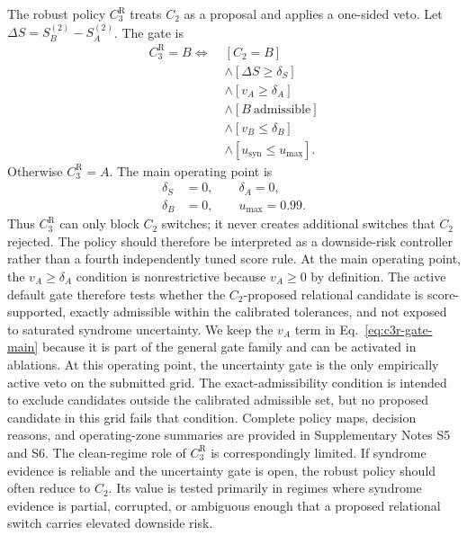 \documentclass{iopjournal}
\begin{document}
The robust policy $C_3^{\mathrm{R}}$ treats $C_2$ as a proposal and applies a
one-sided veto. Let $\Delta S=S_B^{(2)}-S_A^{(2)}$. The gate is
\begin{equation}
\begin{aligned}
C_3^{\mathrm{R}}=B
\Longleftrightarrow\;&
\left[C_2=B\right]
\\
&\wedge
\left[\Delta S\ge\delta_S\right]
\\
&\wedge
\left[v_A\ge\delta_A\right]
\\
&\wedge
\left[B\ \mathrm{admissible}\right]
\\
&\wedge
\left[v_B\le\delta_B\right]
\\
&\wedge
\left[u_{\mathrm{syn}}\le u_{\max}\right].
\end{aligned}
\label{eq:c3r-gate-main}
\end{equation}
Otherwise $C_3^{\mathrm{R}}=A$. The main operating point is
\begin{equation}
\begin{aligned}
\delta_S&=0,
\qquad
\delta_A=0,\\
\delta_B&=0,
\qquad
u_{\max}=0.99.
\end{aligned}
\end{equation}
Thus $C_3^{\mathrm{R}}$ can only block $C_2$ switches; it never creates additional
switches that $C_2$ rejected. The policy should therefore be interpreted as a
downside-risk controller rather than a fourth independently tuned score rule.
At the main operating point, the $v_A\ge\delta_A$ condition is nonrestrictive
because $v_A\ge0$ by definition. The active default gate therefore tests whether
the $C_2$-proposed relational candidate is score-supported, exactly admissible
within the calibrated tolerances, and not exposed to saturated syndrome
uncertainty. We keep the $v_A$ term in Eq.~\eqref{eq:c3r-gate-main} because it is
part of the general gate family and can be activated in ablations.
At this operating point, the uncertainty gate is the only empirically active
veto on the submitted grid. The exact-admissibility condition is intended to
exclude candidates outside the calibrated admissible set, but no proposed
candidate in this grid fails that condition.
Complete policy maps, decision reasons, and operating-zone summaries are provided in
Supplementary Notes S5 and S6.
The clean-regime role of $C_3^{\mathrm R}$ is correspondingly limited. If syndrome
evidence is reliable and the uncertainty gate is open, the robust policy should
often reduce to $C_2$. Its value is tested primarily in regimes where syndrome
evidence is partial, corrupted, or ambiguous enough that a proposed relational
switch carries elevated downside risk.
\end{document}
